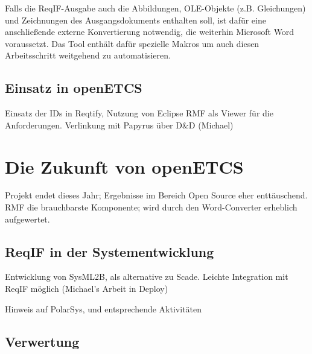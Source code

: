 \documentclass[twoside]{article}
\begin{document}
\begin{multicols}{2}
Falls die ReqIF-Ausgabe auch die Abbildungen, OLE-Objekte (z.B. Gleichungen) und Zeichnungen des Ausgangsdokuments enthalten soll, ist dafür eine anschließende externe Konvertierung notwendig, die weiterhin Microsoft Word voraussetzt. Das Tool enthält dafür spezielle Makros um auch diesen Arbeitsschritt weitgehend zu automatisieren.


\subsection{Einsatz in openETCS}

Einsatz der IDs in Reqtify, Nutzung von Eclipse RMF als Viewer für die Anforderungen. Verlinkung mit Papyrus über D\&D (Michael)

\section{Die Zukunft von openETCS}

Projekt endet dieses Jahr; Ergebnisse im Bereich Open Source eher enttäuschend. RMF die brauchbarste Komponente; wird durch den Word-Converter erheblich aufgewertet.

\subsection{ReqIF in der Systementwicklung}

Entwicklung von SysML2B, als alternative zu Scade.  Leichte Integration mit ReqIF möglich (Michael's Arbeit in Deploy)

Hinweis auf PolarSys, und entsprechende Aktivitäten

\subsection{Verwertung}


\end{multicols}
\end{document}
